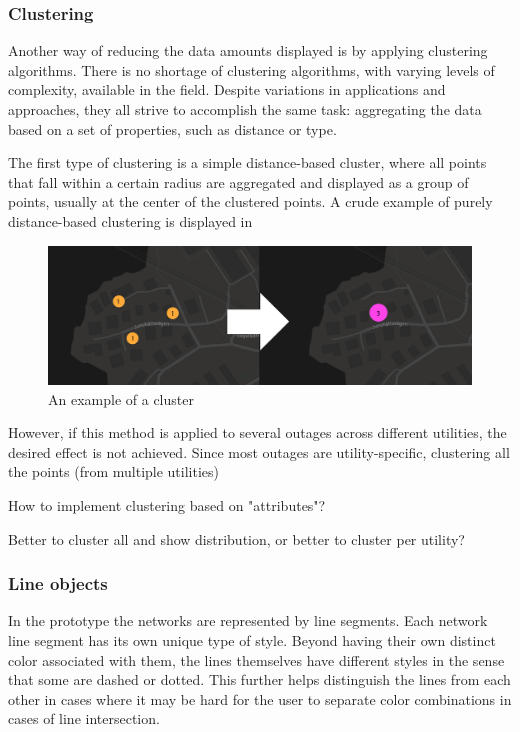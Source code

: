 \documentclass[a4paper,12pt,titlepage]{article}
\begin{document}

\subsubsection{Clustering}

Another way of reducing the data amounts displayed is by applying clustering algorithms. There is no shortage of clustering algorithms, with varying levels of complexity, available in the field. Despite variations in applications and approaches, they all strive to accomplish the same task: aggregating the data based on a set of properties, such as distance or type.

The first type of clustering is a simple distance-based cluster, where all points that fall within a certain radius are aggregated and displayed as a group of points, usually at the center of the clustered points. A crude example of purely distance-based clustering is displayed in 

\begin{figure}[H]
    \centering
        \includegraphics[width=12cm]{Kluster-01.jpg}
    \caption{An example of a cluster}  
    \label{fig:Cluster}
\end{figure}

However, if this method is applied to several outages across different utilities, the desired effect is not achieved. Since most outages are utility-specific, clustering all the points (from multiple utilities)

How to implement clustering based on "attributes"?

Better to cluster all and show distribution, or better to cluster per utility?

\subsubsection{Line objects}

In the prototype the networks are represented by line segments. Each network line segment has its own unique type of style. Beyond having their own distinct color associated with them, the lines themselves have different styles in the sense that some are dashed or dotted. This further helps distinguish the lines from each other in cases where it may be hard for the user to separate color combinations in cases of line intersection.
\end{document}
